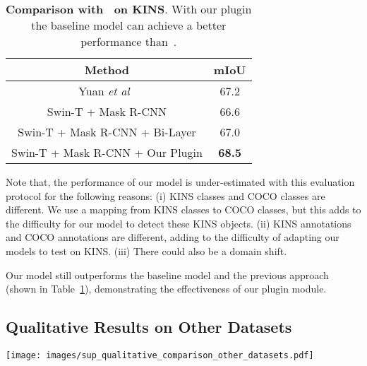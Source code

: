 \documentclass{bmvc2k}
\begin{document}
\begin{table}[!htb]
\centering
\begin{tabular}{cc}
\toprule
  Method & mIoU   \\ \midrule 
  Yuan \emph{et al}~\cite{yuan2021robust} & 67.2 \\ 
Swin-T + Mask R-CNN & 66.6 \\  
Swin-T + Mask R-CNN + Bi-Layer & 67.0 \\ 
Swin-T + Mask R-CNN + Our Plugin & \textbf{68.5} \\ \bottomrule
\end{tabular}
\vspace{.4cm}

\caption{\color{bmvc_blue} \textbf{Comparison with~\cite{yuan2021robust} on KINS}. With our plugin the baseline model can achieve a better performance than~\cite{yuan2021robust}.}
\label{table:sup_compare_alan}
\end{table}

Note that, the performance of our model is under-estimated with this evaluation protocol for the following reasons:
(i) KINS classes and COCO classes are different. We use a mapping from KINS classes to COCO classes, but this adds to the difficulty for our model to detect these KINS objects.
(ii) KINS annotations and COCO annotations are different, adding to the difficulty of adapting our models to test on KINS.
(iii) There could also be a domain shift.

Our model still outperforms the baseline model and the previous approach~\cite{yuan2021robust} (shown in Table~\ref{table:sup_compare_alan}), demonstrating the effectiveness of our plugin module.


\subsection{Qualitative Results on Other Datasets}
\label{sec:sup_other_datasets_qualitative}

\begin{figure*}[h!]
		\centering
		\texttt{[image: images/sup\_qualitative\_comparison\_other\_datasets.pdf]}
		\caption{\color{bmvc_blue} \textbf{Qualitative comparison on other datasets.} Though not trained on these datasets, compared with the baseline, our model can solve the failure patterns of over-segmentation (including part of the occluder in the mask) (Row 1, 3, 4, 6, 7) and under-segmentation (Row 2, 5) for both partially occluded (Row 1, 2, 4, 6, 7) and separated objects (Row 3, 5). OpenImages: Row 1-3; OVIS: Row 4-5; KINS: Row 6-7. }
\label{figure:sup_other_datasets_qualitative_comparison}
 		\vspace{-1.5mm}
\end{figure*}
\end{document}
